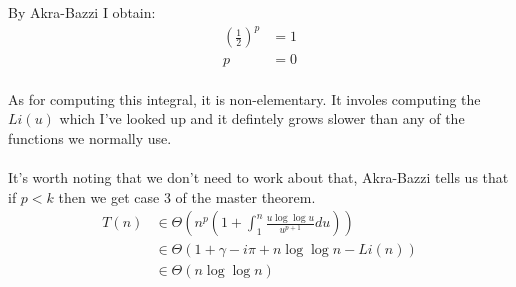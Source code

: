 \documentclass[paper=a4,fontsize=11pt]{article}
\begin{document}
\begin{enumerate}
By Akra-Bazzi I obtain:
\begin{align*}
    (\frac{1}{2})^{p}&=1\\
    p&=0
\end{align*}\\
As for computing this integral, it is non-elementary. It involes computing the $Li(u)$ which I've looked up and it defintely grows slower than any of the functions we normally use.\\\\
It's worth noting that we don't need to work about that, Akra-Bazzi tells us that if $p<k$ then we get case 3 of the master theorem.
\begin{align*}
    T(n) &\in \Theta(n^{p}(1+\int_{1}^{n}{\frac{u\log{\log{u}}}{u^{p+1}}du}))\\
    &\in \Theta(1 + \gamma - i \pi + n\log{\log{n}} - Li(n))\\
    &\in \Theta(n\log{\log{n}})\\
\end{align*}\\
\end{enumerate}
\end{document}
